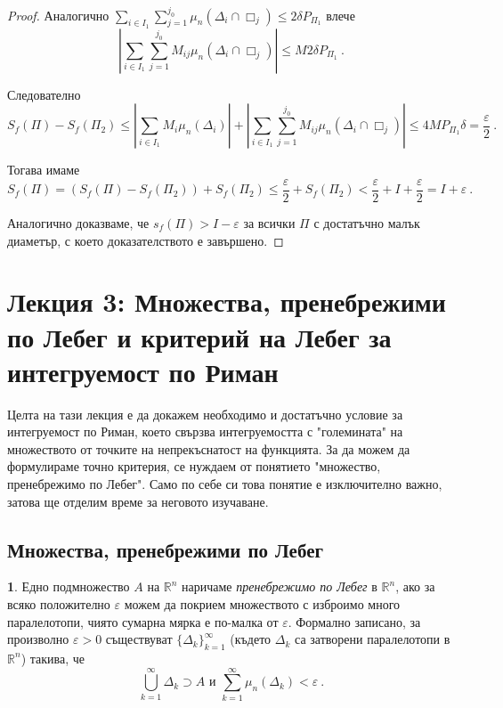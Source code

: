 \documentclass[11pt]{article}
\numberwithin{equation}{section}
\numberwithin{figure}{section}
\numberwithin{table}{section}
\theoremstyle{plain}
\theoremstyle{definition}
\newtheorem{defn}[thm]{\protect\definitionname}
\theoremstyle{remark}
\theoremstyle{definition}
\theoremstyle{remark}
\theoremstyle{plain}
\theoremstyle{definition}
\theoremstyle{definition}
\theoremstyle{plain}
\theoremstyle{plain}
\theoremstyle{plain}
\theoremstyle{definition}
\theoremstyle{plain}
\providecommand{\definitionname}{Дефиниция}
\newcommand*{\R}{\mathbb{R}}
\begin{document}
\begin{proof}
Аналогично
$\sum_{i\in I_1} \sum_{j=1}^{j_0} \mu_n (\Delta_i\cap \Box_j)\leq 2 \delta P_{\Pi_1}$ влече $$\left|\sum_{i\in I_1} \sum_{j=1}^{j_0} M_{ij} \mu_n (\Delta_i\cap \Box_j)\right| \leq M 2 \delta  P_{\Pi_1} \ .$$

Следователно
$$
S_f(\Pi) - S_f(\Pi_2) \leq \left|\sum_{i\in I_1} M_i \mu_n (\Delta_i)\right| + \left|\sum_{i\in I_1} \sum_{j=1}^{j_0} M_{ij} \mu_n (\Delta_i\cap \Box_j)\right| \leq 4M P_{\Pi_1} \delta =  \frac{\varepsilon}{2} \ .
$$

Тогава имаме
$$
S_f(\Pi) = (S_f(\Pi) - S_f(\Pi_2)) + S_f(\Pi_2) \leq \frac{\varepsilon}{2} + S_f(\Pi_2) < \frac{\varepsilon}{2} + I + \frac{\varepsilon}{2} = I+\varepsilon \ .
$$

Аналогично доказваме, че $s_f(\Pi) > I-\varepsilon$ за всички $\Pi$ с достатъчно малък диаметър, с което доказателството е завършено.
\end{proof}

\newpage

\section{Лекция 3: Множества, пренебрежими по Лебег и критерий на Лебег за интегруемост по Риман}

Целта на тази лекция е да докажем необходимо и достатъчно условие за интегруемост по Риман, което свързва интегруемостта с "големината" на множеството от точките на непрекъснатост на функцията. За да можем да формулираме точно критерия, се нуждаем от понятието "множество, пренебрежимо по Лебег". Само по себе си това понятие е изключително важно, затова ще отделим време за неговото изучаване.

\subsection{Множества, пренебрежими по Лебег}

\begin{defn} Едно подмножество $A$ на $\R^n$ наричаме \textit{пренебрежимо по Лебег} в $\R^n$, ако за всяко положително $\varepsilon$ можем да покрием множеството с изброимо много паралелотопи, чиято сумарна мярка е по-малка от $\varepsilon$. Формално записано, за произволно
$\varepsilon > 0$ съществуват $\{\Delta_k \}_{k=1}^\infty$ (където $\Delta_k$ са затворени паралелотопи в $\R^n$) такива, че $$\bigcup_{k=1}^\infty \Delta_k \supset A  \mbox{ и } \sum_{k=1}^\infty \mu_n(\Delta_k)<\varepsilon \ .$$
\end{defn}
\end{document}
